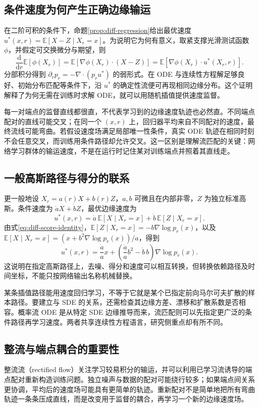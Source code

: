 \documentclass[UTF8,12pt,a4paper,fontset=fandol]{ctexart}
\begin{document}
\subsection{条件速度为何产生正确边缘输运}
在二阶可积的条件下，命题\ref{prop:diff-regression}给出最优速度 $u^*(x,r)=\mathbb E[X-Z\mid X_r=x]$。为说明它为何有意义，取紧支撑光滑测试函数 $\phi$，并假定可交换微分与期望，则
\[
 \frac{\mathrm d}{\mathrm dr}\mathbb E[\phi(X_r)]
 =\mathbb E[\nabla\phi(X_r)\cdot(X-Z)]
 =\mathbb E[\nabla\phi(X_r)\cdot u^*(X_r,r)].
\]
分部积分得到 $\partial_r p_r=-\nabla\cdot(p_ru^*)$ 的弱形式。在 ODE 与连续性方程解足够良好、初始分布匹配等条件下，沿 $u^*$ 的确定性流便可再现相同边缘分布。这个证明解释了为何无需在训练时求解 ODE，就可以用随机插值提供速度监督。

每一对端点的监督直线都很直，不代表学习到的边缘速度轨迹也必然直。不同端点配对的直线可能交叉；在同一个 $(x,r)$ 上，回归器平均来自不同配对的速度，最终流线可能弯曲。若假设速度场满足局部唯一性条件，真实 ODE 轨迹在相同时刻不会任意交叉，而训练用条件路径却允许交叉。这一区别是理解流匹配的关键：网络学习群体的输运速度，不是在运行时记住某对训练端点并照着其直线走。

\subsection{一般高斯路径与得分的联系}
更一般地设 $X_r=a(r)X+b(r)Z$，$a,b$ 可微且在内部非零，$Z$ 为独立标准高斯。条件速度为 $\dot aX+\dot bZ$，最优边缘速度为
\[
 u^*(x,r)=\dot a\,\mathbb E[X\mid X_r=x]+\dot b\,\mathbb E[Z\mid X_r=x].
\]
由式\eqref{eq:diff-score-identity}，$\mathbb E[Z\mid X_r=x]=-b\nabla\log p_r(x)$，以及 $\mathbb E[X\mid X_r=x]=(x+b^2\nabla\log p_r(x))/a$，得到
\begin{equation}
 u^*(x,r)=\frac{\dot a}{a}x+
 \left(\frac{\dot a}{a}b^2-\dot b\,b\right)\nabla\log p_r(x).
 \label{eq:diff-flow-score}
\end{equation}
这说明在指定高斯路径上，去噪、得分和速度可以相互转换，但转换依赖路径及时间坐标，不能只按网络输出名称机械替换。

某条插值路径能用速度回归学习，不等于它就是某个已指定前向马尔可夫扩散的样本路径。要建立与 SDE 的关系，还需检查其边缘方差、漂移和扩散系数是否相容。概率流 ODE 是从特定 SDE 边缘推导而来，流匹配则可以先指定更广泛的条件路径再学习速度。两者共享连续性方程语言，研究侧重点却有所不同。

\subsection{整流与端点耦合的重要性}
整流流（rectified flow）关注学习较易积分的输运，并可以利用已学习流诱导的端点配对重新构造训练问题\cite{liu2023rectified}。独立噪声与数据的配对可能绕行较多；如果端点间关系更协调，平均后的速度场可能具有更简单的轨迹。重新配对不是简单地把所有弯曲轨迹一条条压成直线，而是改变用于监督的耦合，再学习一个新的边缘速度场。
\end{document}

